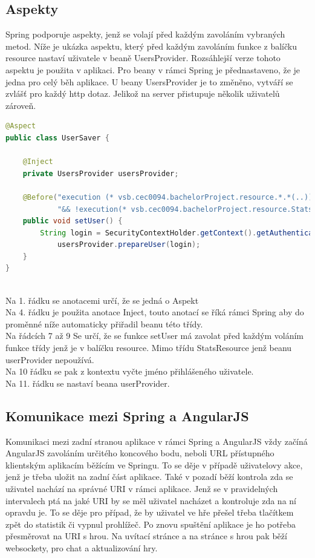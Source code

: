 \documentclass[czech,master,public,dept460,male,cpdeclaration,twoside]{diploma}
\begin{document}
\subsection{Aspekty}
Spring podporuje aspekty, jenž se volají před každým zavoláním vybraných metod. Níže je ukázka aspektu, který před každým zavoláním funkce z balíčku resource nastaví uživatele v beaně UsersProvider. Rozsáhlejší verze tohoto aspektu je použita v aplikaci. Pro beany v rámci Spring je přednastaveno, že je jedna pro celý běh aplikace. U beany UsersProvider je to změněno, vytváří se zvlášť pro každý http dotaz. Jelikož na server přistupuje několik uživatelů zároveň. \\

\begin{lstlisting}[language=Java,label=src:Java, caption=Ukázka aspektu]
@Aspect
public class UserSaver {

    @Inject
    private UsersProvider usersProvider;

    @Before("execution (* vsb.cec0094.bachelorProject.resource.*.*(..))" +
            "&& !execution(* vsb.cec0094.bachelorProject.resource.StatsResource.*(..))")
    public void setUser() {
        String login = SecurityContextHolder.getContext().getAuthentication().getName();
            usersProvider.prepareUser(login);
    }
}
\end{lstlisting}
~\\
Na 1. řádku se anotacemi určí, že se jedná o Aspekt\\
Na 4. řádku je použita anotace Inject, touto anotací se říká rámci Spring aby do proměnné níže automaticky přiřadil beanu této třídy.\\
Na řádcích 7 až 9 Se určí, že se funkce setUser má zavolat před každým voláním funkce třídy jenž je v balíčku resource. Mimo třídu StatsResource jenž beanu userProvider nepoužívá.\\
Na 10 řádku se pak z kontextu vyčte jméno přihlášeného uživatele.\\
Na 11. řádku se nastaví beana userProvider.

\subsection{Komunikace mezi Spring a AngularJS}
Komunikaci mezi zadní stranou aplikace v rámci Spring a AngularJS vždy začíná AngularJS zavoláním určitého koncového bodu, neboli URL přístupného klientským aplikacím běžícím ve Springu. To se děje v případě uživatelovy akce, jenž je třeba uložit na zadní část aplikace. Také v pozadí běží kontrola zda se uživatel nachází na správné URI v rámci aplikace. Jenž se v pravidelných intervalech ptá na jaké URI by se měl uživatel nacházet a kontroluje zda na ní opravdu je. To se děje pro případ, že by uživatel ve hře přešel třeba tlačítkem zpět do statistik či vypnul prohlížeč. Po znovu spuštění aplikace je ho potřeba přesměrovat na URI s hrou. Na uvítací stránce a na stránce s hrou pak běží websockety, pro chat a aktualizování hry.
\end{document}
